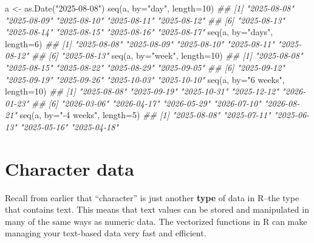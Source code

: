 \documentclass[
  13,
  letterpaper,
]{report}
\newenvironment{Shaded}{\begin{snugshade}}{\end{snugshade}}
\newcommand{\AttributeTok}[1]{\textcolor[rgb]{0.40,0.45,0.13}{#1}}
\newcommand{\DecValTok}[1]{\textcolor[rgb]{0.68,0.00,0.00}{#1}}
\newcommand{\DocumentationTok}[1]{\textcolor[rgb]{0.37,0.37,0.37}{\textit{#1}}}
\newcommand{\FunctionTok}[1]{\textcolor[rgb]{0.28,0.35,0.67}{#1}}
\newcommand{\NormalTok}[1]{\textcolor[rgb]{0.00,0.23,0.31}{#1}}
\newcommand{\OtherTok}[1]{\textcolor[rgb]{0.00,0.23,0.31}{#1}}
\newcommand{\StringTok}[1]{\textcolor[rgb]{0.13,0.47,0.30}{#1}}
\begin{document}
\begin{Shaded}
\begin{Highlighting}[]

\NormalTok{a }\OtherTok{\textless{}{-}} \FunctionTok{as.Date}\NormalTok{(}\StringTok{"2025{-}08{-}08"}\NormalTok{)}
\FunctionTok{seq}\NormalTok{(a, }\AttributeTok{by=}\StringTok{"day"}\NormalTok{, }\AttributeTok{length=}\DecValTok{10}\NormalTok{)}
\DocumentationTok{\#\#  [1] "2025{-}08{-}08" "2025{-}08{-}09" "2025{-}08{-}10" "2025{-}08{-}11" "2025{-}08{-}12"}
\DocumentationTok{\#\#  [6] "2025{-}08{-}13" "2025{-}08{-}14" "2025{-}08{-}15" "2025{-}08{-}16" "2025{-}08{-}17"}
\FunctionTok{seq}\NormalTok{(a, }\AttributeTok{by=}\StringTok{"days"}\NormalTok{, }\AttributeTok{length=}\DecValTok{6}\NormalTok{)}
\DocumentationTok{\#\# [1] "2025{-}08{-}08" "2025{-}08{-}09" "2025{-}08{-}10" "2025{-}08{-}11" "2025{-}08{-}12"}
\DocumentationTok{\#\# [6] "2025{-}08{-}13"}
\FunctionTok{seq}\NormalTok{(a, }\AttributeTok{by=}\StringTok{"week"}\NormalTok{, }\AttributeTok{length=}\DecValTok{10}\NormalTok{)}
\DocumentationTok{\#\#  [1] "2025{-}08{-}08" "2025{-}08{-}15" "2025{-}08{-}22" "2025{-}08{-}29" "2025{-}09{-}05"}
\DocumentationTok{\#\#  [6] "2025{-}09{-}12" "2025{-}09{-}19" "2025{-}09{-}26" "2025{-}10{-}03" "2025{-}10{-}10"}
\FunctionTok{seq}\NormalTok{(a, }\AttributeTok{by=}\StringTok{"6 weeks"}\NormalTok{, }\AttributeTok{length=}\DecValTok{10}\NormalTok{)}
\DocumentationTok{\#\#  [1] "2025{-}08{-}08" "2025{-}09{-}19" "2025{-}10{-}31" "2025{-}12{-}12" "2026{-}01{-}23"}
\DocumentationTok{\#\#  [6] "2026{-}03{-}06" "2026{-}04{-}17" "2026{-}05{-}29" "2026{-}07{-}10" "2026{-}08{-}21"}
\FunctionTok{seq}\NormalTok{(a, }\AttributeTok{by=}\StringTok{"{-}4 weeks"}\NormalTok{, }\AttributeTok{length=}\DecValTok{5}\NormalTok{)}
\DocumentationTok{\#\# [1] "2025{-}08{-}08" "2025{-}07{-}11" "2025{-}06{-}13" "2025{-}05{-}16" "2025{-}04{-}18"}
\end{Highlighting}
\end{Shaded}

\section{Character data}\label{sec-05-char}

Recall from earlier that ``character'' is just another \textbf{type} of
data in R--the type that contains text. This means that text values can
be stored and manipulated in many of the same ways as numeric data. The
vectorized functions in R can make managing your text-based data very
fast and efficient.
\end{document}
